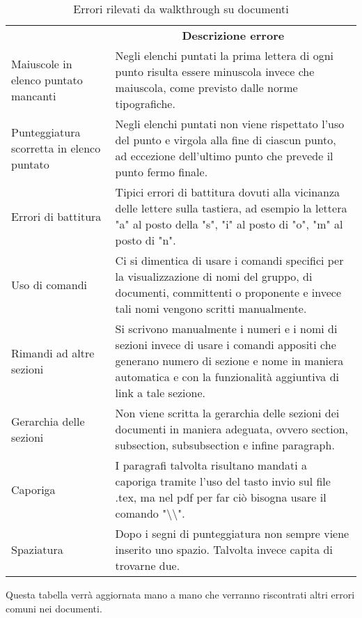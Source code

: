 \begin{table}[H]
	\caption {Errori rilevati da walkthrough su documenti} \label{table:checklisterroriNdP}
	\centering
	\renewcommand{\arraystretch}{1.8}
	\begin{tabular}{p{4 cm} p{9 cm}}
		\rowcolor[HTML]{009ABB} 
		\multicolumn{1}{c}{\color[HTML]{FFFFFF} \textbf{Nome errore}} &
		\multicolumn{1}{c}{\color[HTML]{FFFFFF} \textbf{Descrizione errore}}\\
		\rowcolor[HTML]{CCE6EA}
		Maiuscole in elenco puntato mancanti & Negli elenchi puntati la prima lettera di ogni punto risulta essere minuscola invece che maiuscola, come previsto dalle norme tipografiche.\\
		Punteggiatura scorretta in elenco puntato & Negli elenchi puntati non viene rispettato l'uso del punto e virgola alla fine di ciascun punto, ad eccezione dell'ultimo punto che prevede il punto fermo finale.\\
		Errori di battitura & Tipici errori di battitura dovuti alla vicinanza delle lettere sulla tastiera, ad esempio la lettera "a" al posto della "s", "i" al posto di "o", "m" al posto di "n".\\
		Uso di comandi & Ci si dimentica di usare i comandi specifici per la visualizzazione di nomi del gruppo, di documenti, committenti o proponente e invece tali nomi vengono scritti manualmente.\\
		Rimandi ad altre sezioni & Si scrivono manualmente i numeri e i nomi di sezioni invece di usare i comandi appositi che generano numero di sezione e nome in maniera automatica e con la funzionalità aggiuntiva di link a tale sezione.\\
		Gerarchia delle sezioni & Non viene scritta la gerarchia delle sezioni dei documenti in maniera adeguata, ovvero section, subsection, subsubsection e infine paragraph.\\
		Caporiga & I paragrafi talvolta risultano mandati a caporiga tramite l'uso del tasto invio sul file .tex, ma nel pdf per far ciò bisogna usare il comando "\textbackslash\textbackslash".\\
		Spaziatura & Dopo i segni di punteggiatura non sempre viene inserito uno spazio. Talvolta invece capita di trovarne due.	
	\end{tabular}
\end{table}
Questa tabella verrà aggiornata mano a mano che verranno riscontrati altri errori comuni nei documenti.
